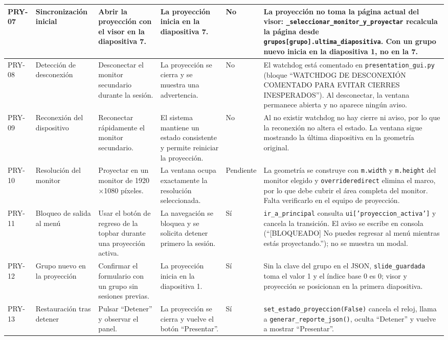 \documentclass[12pt,letterpaper]{article}
\begin{document}
{\begin{longtable}{|L{1.1cm}|L{2.3cm}|L{3.2cm}|L{3.6cm}|L{1.2cm}|L{3.6cm}|}
PRY-07 & Sincronización inicial & Abrir la proyección con el visor en la diapositiva 7. & La proyección inicia en la diapositiva 7. & No & La proyección no toma la página actual del visor: \texttt{\_seleccionar\_monitor\_y\_proyectar} recalcula la página desde \texttt{grupos[grupo].ultima\_diapositiva}. Con un grupo nuevo inicia en la diapositiva 1, no en la 7. \\ \hline
PRY-08 & Detección de desconexión & Desconectar el monitor secundario durante la sesión. & La proyección se cierra y se muestra una advertencia. & No & El watchdog está comentado en \texttt{presentation\_gui.py} (bloque ``WATCHDOG DE DESCONEXIÓN COMENTADO PARA EVITAR CIERRES INESPERADOS''). Al desconectar, la ventana permanece abierta y no aparece ningún aviso. \\ \hline
PRY-09 & Reconexión del dispositivo & Reconectar rápidamente el monitor secundario. & El sistema mantiene un estado consistente y permite reiniciar la proyección. & No & Al no existir watchdog no hay cierre ni aviso, por lo que la reconexión no altera el estado. La ventana sigue mostrando la última diapositiva en la geometría original. \\ \hline
PRY-10 & Resolución del monitor & Proyectar en un monitor de 1920$\times$1080 píxeles. & La ventana ocupa exactamente la resolución seleccionada. & Pendiente & La geometría se construye con \texttt{m.width} y \texttt{m.height} del monitor elegido y \texttt{overrideredirect} elimina el marco, por lo que debe cubrir el área completa del monitor. Falta verificarlo en el equipo de proyección. \\ \hline
PRY-11 & Bloqueo de salida al menú & Usar el botón de regreso de la topbar durante una proyección activa. & La navegación se bloquea y se solicita detener primero la sesión. & Sí & \texttt{ir\_a\_principal} consulta \texttt{ui['proyeccion\_activa']} y cancela la transición. El aviso se escribe en consola (``[BLOQUEADO] No puedes regresar al menú mientras estás proyectando.''); no se muestra un modal. \\ \hline
PRY-12 & Grupo nuevo en la proyección & Confirmar el formulario con un grupo sin sesiones previas. & La proyección inicia en la diapositiva 1. & Sí & Sin la clave del grupo en el JSON, \texttt{slide\_guardada} toma el valor 1 y el índice base 0 es 0; visor y proyección se posicionan en la primera diapositiva. \\ \hline
PRY-13 & Restauración tras detener & Pulsar ``Detener'' y observar el panel. & La proyección se cierra y vuelve el botón ``Presentar''. & Sí & \texttt{set\_estado\_proyeccion(False)} cancela el reloj, llama a \texttt{generar\_reporte\_json()}, oculta ``Detener'' y vuelve a mostrar ``Presentar''. \\ \hline

\end{longtable}}
\end{document}
